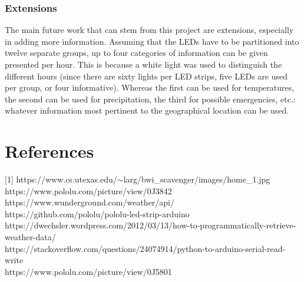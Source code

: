 \documentclass[12pt]{article}
\begin{document}
\subsubsection{Extensions}
The main future work that can stem from this project are extensions, especially in adding more information. Assuming that the LEDs have to be partitioned into twelve separate groups, up to four categories of information can be given presented per hour. This is because a white light was used to distinguish the different hours (since there are sixty lights per LED strips, five LEDs are used per group, or four informative). Whereas the first can be used for temperatures, the second can be used for precipitation, the third for possible emergencies, etc.: whatever information most pertinent to the geographical location can be used.


\section{References}

[1] https://www.cs.utexas.edu/$\sim$larg/bwi\_scavenger/images/home\_1.jpg\\ \relax
[2] https://www.pololu.com/picture/view/0J3842\\ \relax
[3] https://www.wunderground.com/weather/api/\\ \relax
[4] https://github.com/pololu/pololu-led-strip-arduino\\ \relax
[5] https://dwechsler.wordpress.com/2012/03/13/how-to-programmatically-retrieve-weather-data/\\ \relax
[6] https://stackoverflow.com/questions/24074914/python-to-arduino-serial-read-write\\ \relax
[7] https://www.pololu.com/picture/view/0J5801
\end{document}
